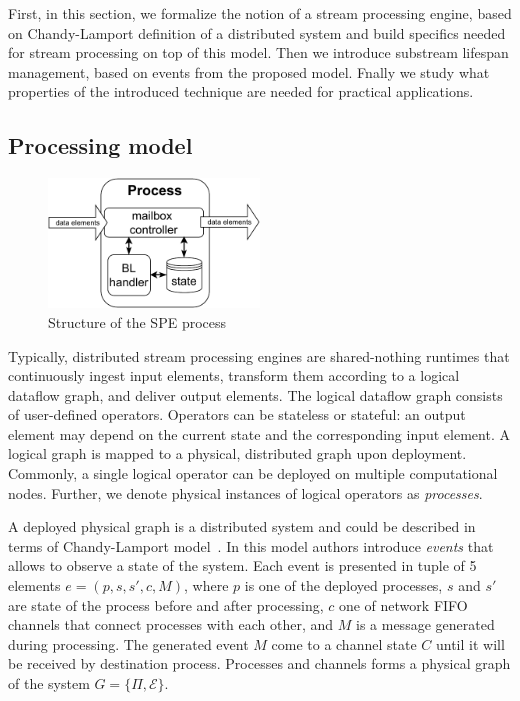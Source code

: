 \label{fs-acker-preliminaries}

First, in this section, we formalize the notion of a stream processing engine, based on Chandy-Lamport definition of a distributed system and build specifics needed for stream processing on top of this model. Then we introduce substream lifespan management, based on events from the proposed model. Fnally we study what properties of the introduced    technique are needed for practical applications.

\subsection{Processing model}

\begin{figure}[htbp]
  \centering
  \includegraphics[width=0.50\textwidth]{pics/process-scheme.pdf}
  \caption{Structure of the SPE process}
  \label{fig:spe_process}
\end{figure}

Typically, distributed stream processing engines are shared-nothing runtimes that continuously ingest input elements, transform them according to a logical dataflow graph, and deliver output elements. The logical dataflow graph consists of user-defined operators. Operators can be stateless or stateful: an output element may depend on the current state and the corresponding input element. A logical graph is mapped to a physical, distributed graph upon deployment. Commonly, a single logical operator can be deployed on multiple computational nodes. Further, we denote physical instances of logical operators as {\em processes}.

A deployed physical graph is a distributed system and could be described in terms of Chandy-Lamport model~\cite{lamport}. In this model authors introduce \textit{events} that allows to observe a state of the system. Each event is presented in tuple of 5 elements $e = (p, s, s', c, M)$, where $p$ is one of the deployed processes, $s$ and $s'$ are state of the process before and after processing, $c$ one of network FIFO channels that connect processes with each other, and $M$ is a message generated during processing. The generated event $M$ come to a channel state $C$ until it will be received by destination process. Processes and channels forms a physical graph of the system $G=\{\Pi,\mathcal{E}\}$.

